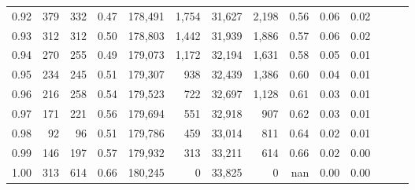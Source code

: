 \begin{tabular}{rrrrrrrrrrrrrr}
0.92 &    379 &  332 &  0.47 &  178,491 &    1,754 &  31,627 &   2,198 &  0.56 &  0.06 &      0.02 \\
0.93 &    312 &  312 &  0.50 &  178,803 &    1,442 &  31,939 &   1,886 &  0.57 &  0.06 &      0.02 \\
0.94 &    270 &  255 &  0.49 &  179,073 &    1,172 &  32,194 &   1,631 &  0.58 &  0.05 &      0.01 \\
0.95 &    234 &  245 &  0.51 &  179,307 &      938 &  32,439 &   1,386 &  0.60 &  0.04 &      0.01 \\
0.96 &    216 &  258 &  0.54 &  179,523 &      722 &  32,697 &   1,128 &  0.61 &  0.03 &      0.01 \\
0.97 &    171 &  221 &  0.56 &  179,694 &      551 &  32,918 &     907 &  0.62 &  0.03 &      0.01 \\
0.98 &     92 &   96 &  0.51 &  179,786 &      459 &  33,014 &     811 &  0.64 &  0.02 &      0.01 \\
0.99 &    146 &  197 &  0.57 &  179,932 &      313 &  33,211 &     614 &  0.66 &  0.02 &      0.00 \\
1.00 &    313 &  614 &  0.66 &  180,245 &        0 &  33,825 &       0 &   nan &  0.00 &      0.00 \\
\bottomrule
\end{tabular}
